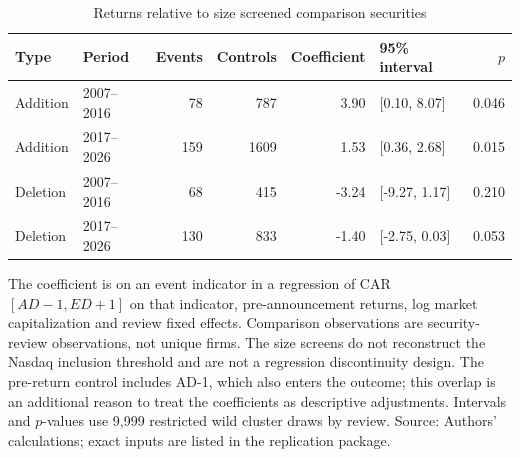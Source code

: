 \begin{table}[!htbp]
\centering
\caption{Returns relative to size screened comparison securities}\label{tab:comparators}
\small
\setlength{\tabcolsep}{5pt}
\begin{tabular}{llrrrlr}
\toprule
Type & Period & Events & Controls & Coefficient & 95\% interval & $p$ \\
\midrule
Addition & 2007--2016 & 78 & 787 & 3.90 & [0.10, 8.07] & 0.046 \\
Addition & 2017--2026 & 159 & 1609 & 1.53 & [0.36, 2.68] & 0.015 \\
Deletion & 2007--2016 & 68 & 415 & -3.24 & [-9.27, 1.17] & 0.210 \\
Deletion & 2017--2026 & 130 & 833 & -1.40 & [-2.75, 0.03] & 0.053 \\
\bottomrule
\end{tabular}
\begin{minipage}{\linewidth}\footnotesize\vspace{5pt}
The coefficient is on an event indicator in a regression of CAR $[AD-1,ED+1]$ on that indicator, pre-announcement returns, log market capitalization and review fixed effects. Comparison observations are security-review observations, not unique firms. The size screens do not reconstruct the Nasdaq inclusion threshold and are not a regression discontinuity design. The pre-return control includes AD-1, which also enters the outcome; this overlap is an additional reason to treat the coefficients as descriptive adjustments. Intervals and $p$-values use 9,999 restricted wild cluster draws by review. Source: Authors' calculations; exact inputs are listed in the replication package.
\end{minipage}
\end{table}
